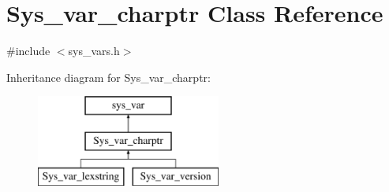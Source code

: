 \hypertarget{classSys__var__charptr}{}\section{Sys\+\_\+var\+\_\+charptr Class Reference}
\label{classSys__var__charptr}


{\ttfamily \#include $<$sys\+\_\+vars.\+h$>$}

Inheritance diagram for Sys\+\_\+var\+\_\+charptr\+:\begin{figure}[H]
\begin{center}
\leavevmode
\includegraphics[height=3.000000cm]{classSys__var__charptr}
\end{center}
\end{figure}
